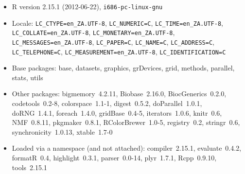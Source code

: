 \documentclass[a4paper]{article}\usepackage{graphicx, color}
\begin{document}
\begin{itemize}\raggedright
  \item R version 2.15.1 (2012-06-22), \verb|i686-pc-linux-gnu|
  \item Locale: \verb|LC_CTYPE=en_ZA.UTF-8|, \verb|LC_NUMERIC=C|, \verb|LC_TIME=en_ZA.UTF-8|, \verb|LC_COLLATE=en_ZA.UTF-8|, \verb|LC_MONETARY=en_ZA.UTF-8|, \verb|LC_MESSAGES=en_ZA.UTF-8|, \verb|LC_PAPER=C|, \verb|LC_NAME=C|, \verb|LC_ADDRESS=C|, \verb|LC_TELEPHONE=C|, \verb|LC_MEASUREMENT=en_ZA.UTF-8|, \verb|LC_IDENTIFICATION=C|
  \item Base packages: base, datasets, graphics,
    grDevices, grid, methods, parallel, stats, utils
  \item Other packages: bigmemory~4.2.11,
    Biobase~2.16.0, BiocGenerics~0.2.0,
    codetools~0.2-8, colorspace~1.1-1, digest~0.5.2,
    doParallel~1.0.1, doRNG~1.4.1, foreach~1.4.0,
    gridBase~0.4-5, iterators~1.0.6, knitr~0.6,
    NMF~0.8.11, pkgmaker~0.8.1, RColorBrewer~1.0-5,
    registry~0.2, stringr~0.6, synchronicity~1.0.13,
    xtable~1.7-0
  \item Loaded via a namespace (and not attached):
    compiler~2.15.1, evaluate~0.4.2, formatR~0.4,
    highlight~0.3.1, parser~0.0-14, plyr~1.7.1,
    Rcpp~0.9.10, tools~2.15.1
\end{itemize}




\printbibliography[heading=bibintoc]
\end{document}
